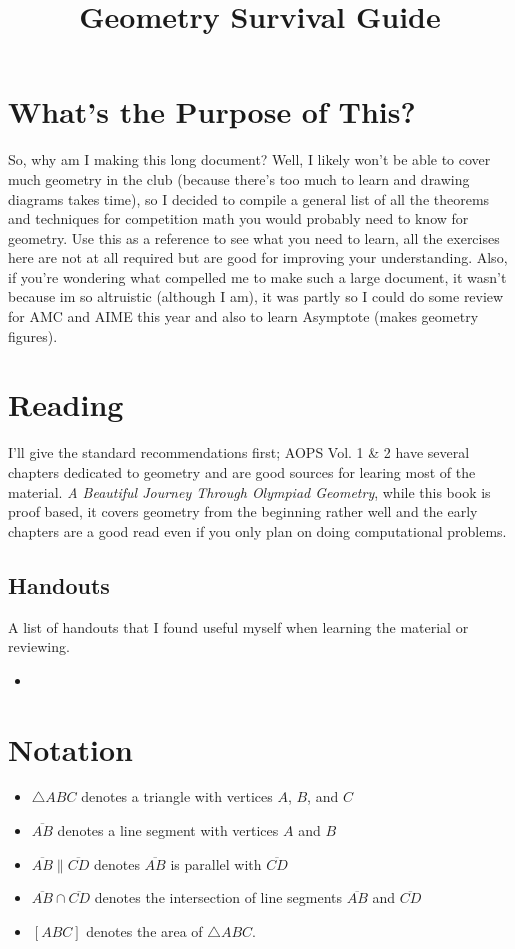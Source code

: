 \documentclass[11pt]{article}
\begin{document}
\title{Geometry Survival Guide}
\maketitle

\section*{What's the Purpose of This?}
\par So, why am I making this long document? Well, I likely won't be able to cover
much geometry in the club (because there's too much to learn and drawing diagrams takes time), so I decided to compile a general list of all the theorems and techniques
for competition math you would probably need to know for geometry. Use this as a reference to see what you need to learn, all the exercises
here are not at all required but are good for improving your understanding. Also, if you're wondering what compelled me to make such a large document, it wasn't because im so altruistic (although I am),  it was partly so I could do some
review for AMC and AIME this year and also to learn Asymptote (makes geometry figures).

\tableofcontents
\section{Reading}
I'll give the standard recommendations first; AOPS Vol. 1 \& 2 have several chapters dedicated to geometry and are good sources for learing most of the material. \textit{A Beautiful Journey Through Olympiad Geometry}, while this book is proof based, it covers geometry from the beginning rather well
and the early chapters are a good read even if you only plan on doing computational problems. 
\subsection*{Handouts}
A list of handouts that I found useful myself when learning the material or reviewing.
\begin{itemize}
    \item
\end{itemize}
\section{Notation}
\begin{itemize}
    \item $\triangle ABC$ denotes a triangle with vertices $A$, $B$, and $C$ 
    \item $\overline{AB}$ denotes a line segment with vertices $A$ and $B$
    \item $\overline{AB} \parallel \overline{CD}$ denotes $\overline{AB}$ is parallel with $\overline{CD}$
    \item $\overline{AB} \cap  \overline{CD}$ denotes the intersection of line segments $\overline{AB}$ and $\overline{CD}$
    \item $[ABC]$ denotes the area of $\triangle ABC$.
\end{itemize}
\end{document}
